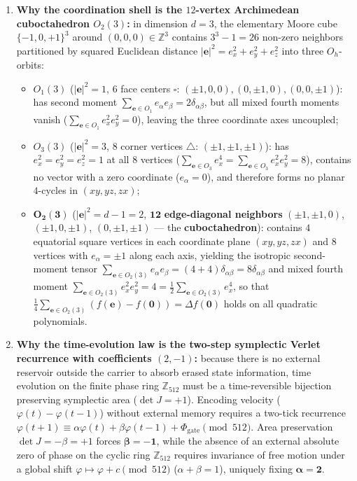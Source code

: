 \documentclass[11pt,a4paper]{article}
\theoremstyle{plain}
\theoremstyle{definition}
\begin{document}
\begin{enumerate}[label=\textbf{Step \arabic*.},leftmargin=*]
\item \textbf{Why the coordination shell is the $12$-vertex Archimedean cuboctahedron $O_2(3)$:}
  in dimension $d = 3$, the elementary Moore cube $\{-1,0,+1\}^3$ around $(0,0,0)\in\mathbb{Z}^3$ contains $3^3 - 1 = 26$ non-zero neighbors partitioned by squared Euclidean distance $|\mathbf{e}|^2 = e_x^2 + e_y^2 + e_z^2$ into three $O_h$-orbits:
  \begin{itemize}[noitemsep]
  \item $O_1(3)$ ($|\mathbf{e}|^2 = 1$, $6$ face centers $\square$: $(\pm 1,0,0),(0,\pm 1,0),(0,0,\pm 1)$): has second moment $\sum_{\mathbf{e}\in O_1} e_\alpha e_\beta = 2\delta_{\alpha\beta}$, but all mixed fourth moments vanish ($\sum_{\mathbf{e}\in O_1} e_x^2 e_y^2 = 0$), leaving the three coordinate axes uncoupled;
  \item $O_3(3)$ ($|\mathbf{e}|^2 = 3$, $8$ corner vertices $\triangle$: $(\pm 1,\pm 1,\pm 1)$): has $e_x^2 = e_y^2 = e_z^2 = 1$ at all $8$ vertices ($\sum_{\mathbf{e}\in O_3} e_x^4 = \sum_{\mathbf{e}\in O_3} e_x^2 e_y^2 = 8$), contains no vector with a zero coordinate ($e_\alpha = 0$), and therefore forms no planar $4$-cycles in $(xy,yz,zx)$;
  \item $\mathbf{O_2(3)}$ ($|\mathbf{e}|^2 = d - 1 = 2$, $\mathbf{12}$ \textbf{edge-diagonal neighbors} $(\pm 1,\pm 1,0)$, $(\pm 1,0,\pm 1)$, $(0,\pm 1,\pm 1)$ --- the \textbf{cuboctahedron}): contains $4$ equatorial square vertices in each coordinate plane $(xy,yz,zx)$ and $8$ vertices with $e_\alpha = \pm 1$ along each axis, yielding the isotropic second-moment tensor $\sum_{\mathbf{e}\in O_2(3)} e_\alpha e_\beta = (4+4)\delta_{\alpha\beta} = 8\delta_{\alpha\beta}$ and mixed fourth moment $\sum_{\mathbf{e}\in O_2(3)} e_x^2 e_y^2 = 4 = \frac{1}{2}\sum_{\mathbf{e}\in O_2(3)} e_x^4$, so that $\frac{1}{4}\sum_{\mathbf{e}\in O_2(3)}(f(\mathbf{e})-f(\mathbf{0})) = \Delta f(\mathbf{0})$ holds on all quadratic polynomials.
  \end{itemize}

\item \textbf{Why the time-evolution law is the two-step symplectic Verlet recurrence with coefficients $(2,-1)$:}
  because there is no external reservoir outside the carrier to absorb erased state information, time evolution on the finite phase ring $\mathbb{Z}_{512}$ must be a time-reversible bijection preserving symplectic area ($\det J = +1$). Encoding velocity ($\varphi(t)-\varphi(t-1)$) without external memory requires a two-tick recurrence $\varphi(t+1)\equiv \alpha\varphi(t)+\beta\varphi(t-1)+\Phi_{\mathrm{gate}}\pmod{512}$. Area preservation $\det J = -\beta = +1$ forces $\mathbf{\beta = -1}$, while the absence of an external absolute zero of phase on the cyclic ring $\mathbb{Z}_{512}$ requires invariance of free motion under a global shift $\varphi\mapsto\varphi + c\pmod{512}$ ($\alpha+\beta = 1$), uniquely fixing $\mathbf{\alpha = 2}$.
\end{enumerate}
\end{document}
